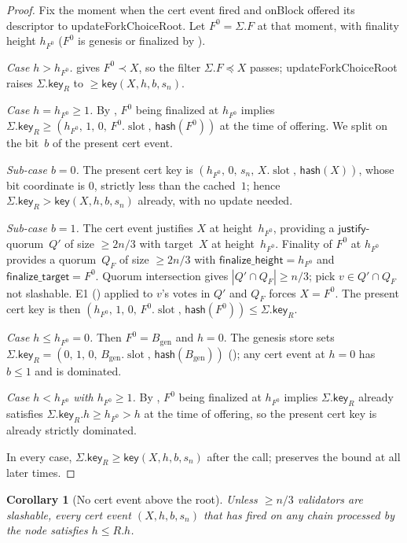 \ifx\litemode\undefined\documentclass{article}\fi
\newcommand{\genesis}{\ensuremath{B_{\mathrm{gen}}}}
\newcommand{\slot}[0]{\ensuremath{\operatorname{\mathrm{slot}}}}
\newcommand{\just}{\ensuremath{\mathsf{justify}}\xspace}
\newcommand{\finalizeHeight}{\mathsf{finalize\_height}}
\newcommand{\finalizeTarget}{\mathsf{finalize\_target}}
\newcommand{\hash}{\mathsf{hash}}
\newcommand{\key}{\mathsf{key}}
\newcommand{\onBlock}{\textsf{onBlock}\xspace}
\newcommand{\updateForkChoiceRoot}{\textsf{updateForkChoiceRoot}\xspace}
\theoremstyle{plain}
\newtheorem{corollary}{Corollary}
\theoremstyle{definition}
\theoremstyle{remark}
\begin{document}
\begin{proof}
Fix the moment when the cert event fired and \onBlock offered its descriptor to \updateForkChoiceRoot. Let $F^0 = \Sigma.F$ at that moment, with finality height $h_{F^0}$ ($F^0$ is genesis or finalized by ).

\emph{Case $h > h_{F^0}$.}  gives $F^0 \prec X$, so the filter $\Sigma.F \preceq X$ passes; \updateForkChoiceRoot raises $\Sigma.\key_R$ to $\geq \key(X, h, b, s_n)$.

\emph{Case $h = h_{F^0} \geq 1$.}
By , $F^0$ being finalized at $h_{F^0}$ implies $\Sigma.\key_R \geq (h_{F^0},\, 1,\, 0,\, F^0.\slot,\, \hash(F^0))$ at the time of offering. We split on the bit~$b$ of the present cert event.

\emph{Sub-case $b = 0$.} The present cert key is $(h_{F^0},\, 0,\, s_n,\, X.\slot,\, \hash(X))$, whose bit coordinate is $0$, strictly less than the cached~$1$; hence $\Sigma.\key_R > \key(X, h, b, s_n)$ already, with no update needed.

\emph{Sub-case $b = 1$.} The cert event justifies $X$ at height~$h_{F^0}$, providing a \just-quorum~$Q'$ of size $\geq 2n/3$ with target~$X$ at height~$h_{F^0}$. Finality of $F^0$ at $h_{F^0}$ provides a quorum~$Q_F$ of size $\geq 2n/3$ with $\finalizeHeight = h_{F^0}$ and $\finalizeTarget = F^0$. Quorum intersection gives $|Q' \cap Q_F| \geq n/3$; pick $v \in Q' \cap Q_F$ not slashable. E1 () applied to $v$'s votes in $Q'$ and $Q_F$ forces $X = F^0$. The present cert key is then $(h_{F^0},\, 1,\, 0,\, F^0.\slot,\, \hash(F^0)) \leq \Sigma.\key_R$.

\emph{Case $h \leq h_{F^0} = 0$.} Then $F^0 = \genesis$ and $h = 0$. The genesis store sets $\Sigma.\key_R = (0,\, 1,\, 0,\, \genesis.\slot,\, \hash(\genesis))$ (); any cert event at $h = 0$ has $b \leq 1$ and is dominated.

\emph{Case $h < h_{F^0}$ with $h_{F^0} \geq 1$.} By , $F^0$ being finalized at $h_{F^0}$ implies $\Sigma.\key_R$ already satisfies $\Sigma.\key_R.h \geq h_{F^0} > h$ at the time of offering, so the present cert key is already strictly dominated.

In every case, $\Sigma.\key_R \geq \key(X, h, b, s_n)$ after the call;  preserves the bound at all later times.
\end{proof}

\begin{corollary}[No cert event above the root]\label{rev:cor:no-high-cn}
Unless $\geq n/3$ validators are slashable, every cert event $(X, h, b, s_n)$ that has fired on any chain processed by the node satisfies $h \leq R.h$.
\end{corollary}
\end{document}

